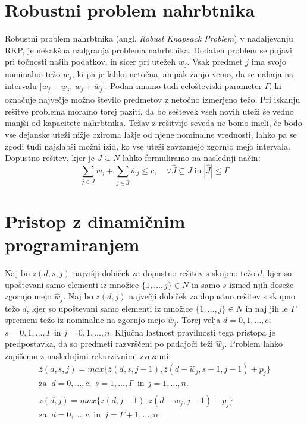 \documentclass[a4paper,12pt]{article}
\theoremstyle{definition}
\begin{document}
\section{Robustni problem nahrbtnika}
\medskip
Robustni problem nahrbtnika (angl. \textit{Robust Knapsack Problem}) v nadaljevanju 
RKP, je nekakšna nadgranja problema nahrbtnika. Dodaten problem se pojavi pri točnosti 
naših podatkov, in sicer pri utežeh $w_{j}$. Vsak predmet $j$ ima svojo nominalno težo 
$w_{j}$, ki pa je lahko netočna, ampak zanjo vemo, da se nahaja na intervalu 
[$w_{j} - \underline{w}_{j}$, $w_{j} + \overline{w}_{j}$]. Podan imamo tudi celošteviski parameter $\Gamma$,
ki označuje največje možno število predmetov z netočno izmerjeno težo. Pri iskanju 
rešitve problema moramo torej paziti, da bo seštevek vseh novih uteži še vedno manjši od
kapacitete nahrbtnika. Težav z rešitvijo seveda ne bomo imeli, če bodo vse dejanske uteži
nižje oziroma lažje od njene nominalne vrednosti, lahko pa se zgodi tudi najslabši možni 
izid, ko vse uteži zavzamejo zgornjo mejo intervala. Dopustno rešitev, kjer je
$J \subseteq N$ lahko formuliramo na naslednji način: 
\begin{equation}
    \tag*{}
    \sum_{j \in J}w_{j} + \sum_{j \in \hat{J}}\overline{w}_{j} \leq c,\quad \forall \hat{J} \subseteq J \; \text{in}\; |\hat{J}| \leq \Gamma 
\end{equation}


\section{Pristop z dinamičnim programiranjem}   %
\medskip
Naj bo $ \bar{z}(d, s, j) $ najvišji dobiček za dopustno rešitev s skupno težo $d$, kjer so upoštevani 
samo elementi iz množice $\{1, \dots,j\} \in N$ in samo $s$ izmed njih doseže zgornjo mejo $\hat{w}_j$. 
Naj bo $z(d, j)$ največji dobiček za dopustno rešitev s skupno težo $d$, kjer so upoštevani samo elementi 
iz množice $\{ 1,\dots,j \} \in N $ in naj jih le $\Gamma $ spremeni težo iz nominalne na zgornjo mejo $\hat{w}_j$. 
Torej velja $d = 0, 1, \dots, c$; $s = 0, 1, \dots, \Gamma$ in $ j = 0, 1, \dots, n$.
Ključna lastnost pravilnosti tega pristopa je predpostavka, da so predmeti razvrščeni po padajoči teži $\hat{w}_j$. 
Problem lahko zapišemo z naslednjimi rekurzivnimi zvezami: 
\begin{equation}  
    \tag*{}
    \begin{matrix}
    \bar{z}(d, s, j) = max\{ \bar{z}(d, s, j - 1), \bar{z}(d - \hat{w}_j, s- 1, j - 1) + p_j\} \\
    \text{za} \; \; d = 0,\dots, c; \; s = 1,\dots, \Gamma \:\: \text{in} \:\:j = 1,\dots, n. \\ 
    \\
    z(d, j) = max\{z(d, j - 1), z (d - w_j, j - 1) + p_j\} \\
    \text{za} \; \; d = 0,\dots, c\;\;\text{in}\;\: j = \Gamma + 1,\dots, n.
    \end{matrix}
\end{equation} 
\end{document}
